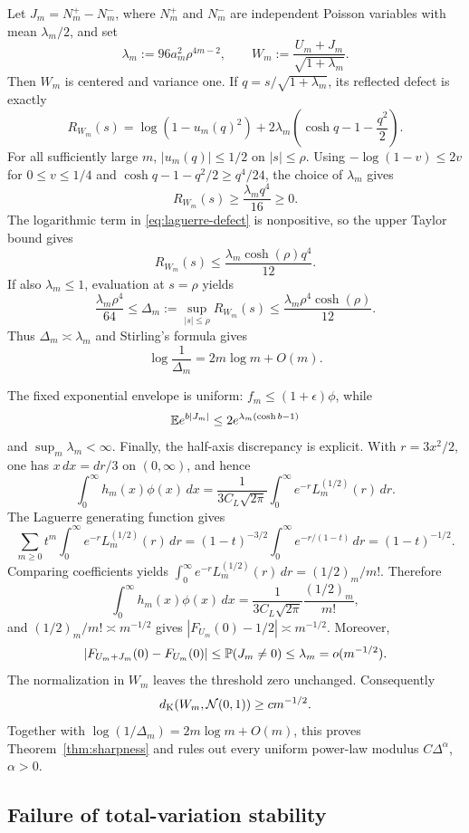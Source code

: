 Let $J_m=N_m^+-N_m^-$, where $N_m^+$ and $N_m^-$ are independent Poisson variables with mean $\lambda_m/2$, and set
\[
\lambda_m:=96a_m^2\rho^{4m-2},
\qquad
W_m:=\frac{U_m+J_m}{\sqrt{1+\lambda_m}}.
\]
Then $W_m$ is centered and variance one. If $q=s/\sqrt{1+\lambda_m}$, its reflected defect is exactly
\begin{equation}\label{eq:laguerre-defect}
R_{W_m}(s)
 =\log(1-u_m(q)^2)
 +2\lambda_m\left(\cosh q-1-\frac{q^2}{2}\right).
\end{equation}
For all sufficiently large $m$, $|u_m(q)|\le1/2$ on $|s|\le\rho$. Using $-\log(1-v)\le2v$ for $0\le v\le1/4$ and $\cosh q-1-q^2/2\ge q^4/24$, the choice of $\lambda_m$ gives
\[
R_{W_m}(s)\ge\frac{\lambda_m q^4}{16}\ge0.
\]
The logarithmic term in \eqref{eq:laguerre-defect} is nonpositive, so the upper Taylor bound gives
\[
R_{W_m}(s)\le\frac{\lambda_m\cosh(\rho)q^4}{12}.
\]
If also $\lambda_m\le1$, evaluation at $s=\rho$ yields
\[
\frac{\lambda_m\rho^4}{64}\le\Delta_m:=\sup_{|s|\le\rho}R_{W_m}(s)
\le\frac{\lambda_m\rho^4\cosh(\rho)}{12}.
\]
Thus $\Delta_m\asymp\lambda_m$ and Stirling's formula gives
\[
\log\frac1{\Delta_m}=2m\log m+O(m).
\]

The fixed exponential envelope is uniform: $f_m\le(1+\epsilon)\phi$, while
\[
\mathbb E e^{b|J_m|}\le2e^{\lambda_m(\cosh b-1)}
\]
and $\sup_m\lambda_m<\infty$. Finally, the half-axis discrepancy is explicit. With $r=3x^2/2$, one has $x\,dx=dr/3$ on $(0,\infty)$, and hence
\[
\int_0^\infty h_m(x)\phi(x)\,dx
 =\frac{1}{3C_L\sqrt{2\pi}}
 \int_0^\infty e^{-r}L_m^{(1/2)}(r)\,dr.
\]
The Laguerre generating function gives
\[
\sum_{m\ge0}t^m\int_0^\infty e^{-r}L_m^{(1/2)}(r)\,dr
 =(1-t)^{-3/2}\int_0^\infty e^{-r/(1-t)}\,dr
 =(1-t)^{-1/2}.
\]
Comparing coefficients yields $\int_0^\infty e^{-r}L_m^{(1/2)}(r)\,dr=(1/2)_m/m!$. Therefore
\[
\int_0^\infty h_m(x)\phi(x)\,dx
 =\frac{1}{3C_L\sqrt{2\pi}}\frac{(1/2)_m}{m!},
\]
and $(1/2)_m/m!\asymp m^{-1/2}$ gives $|F_{U_m}(0)-1/2|\asymp m^{-1/2}$. Moreover,
\[
|F_{U_m+J_m}(0)-F_{U_m}(0)|\le\mathbb P(J_m\ne0)\le\lambda_m=o(m^{-1/2}).
\]
The normalization in $W_m$ leaves the threshold zero unchanged. Consequently
\[
d_{\mathrm K}(W_m,\mathcal N(0,1))\ge c m^{-1/2}.
\]
Together with $\log(1/\Delta_m)=2m\log m+O(m)$, this proves Theorem~\ref{thm:sharpness} and rules out every uniform power-law modulus $C\Delta^\alpha$, $\alpha>0$.

\subsection{Failure of total-variation stability}

